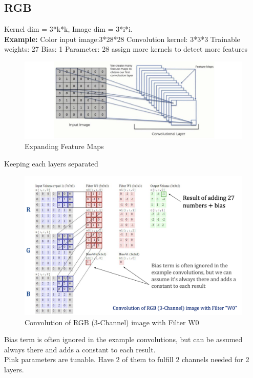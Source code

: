 \documentclass[11pt, english]{article}
\begin{document}
\subsection{RGB}
Kernel dim = 3*k*k,
Image dim = 3*i*i.\\
\textbf{Example:}
Color input image:3*28*28
Convolution kernel: 3*3*3
Trainable weights: 27
Bias: 1
Parameter: 28
assign more kernels to detect more features\\
\begin{figure}[H]
    \centering
    \includegraphics[width=0.75\linewidth]{Screenshot 2025-01-28 at 7.24.16 PM.png}
    \caption{Expanding Feature Maps}
    \label{fig:enter-label}
\end{figure}
Keeping each layers separated
\begin{figure}[H]
    \centering
    \includegraphics[width=0.75\linewidth]{Screenshot 2025-01-28 at 7.32.23 PM.png}
    \caption{Convolution of RGB (3-Channel) image with Filter W0}
    \label{fig:enter-label}
\end{figure}
Bias term is often ignored in the example convolutions, but can be assumed always there and adds a constant to each result.\\
Pink parameters are tunable. Have 2 of them to fulfill 2 channels needed for 2 layers.
\end{document}
